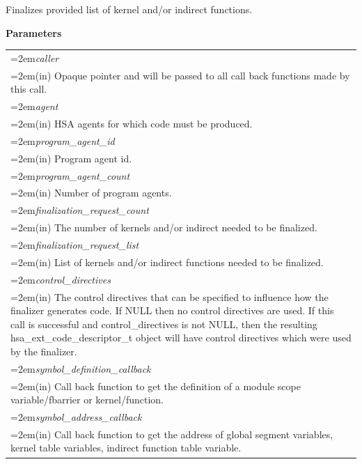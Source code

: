 \documentclass[final]{book}
\newcommand{\hsaarg}[1]{\textit{#1}}
\begin{document}
\vspace{-2mm}Finalizes provided list of kernel and/or indirect functions.

\noindent\textbf{Parameters}\\[-6mm]
\noindent\begin{longtable}{@{}>{\hangindent=2em}p{\textwidth}}
\hsaarg{caller}\\\hspace{2em}(in) Opaque pointer and will be passed to all call back functions made by this call.\\[2mm]
\hsaarg{agent}\\\hspace{2em}(in) HSA agents for which code must be produced.\\[2mm]
\hsaarg{program_\-agent_\-id}\\\hspace{2em}(in) Program agent id.\\[2mm]
\hsaarg{program_\-agent_\-count}\\\hspace{2em}(in) Number of program agents.\\[2mm]
\hsaarg{finalization_\-request_\-count}\\\hspace{2em}(in) The number of kernels and/or indirect needed to be finalized.\\[2mm]
\hsaarg{finalization_\-request_\-list}\\\hspace{2em}(in) List of kernels and/or indirect functions needed to be finalized.\\[2mm]
\hsaarg{control_\-directives}\\\hspace{2em}(in) The control directives that can be specified to influence how the finalizer generates code. If NULL then no control directives are used. If this call is successful and control_\-directives is not NULL, then the resulting hsa_\-ext_\-code_\-descriptor_\-t object will have control directives which were used by the finalizer.\\[2mm]
\hsaarg{symbol_\-definition_\-callback}\\\hspace{2em}(in) Call back function to get the definition of a module scope variable/fbarrier or kernel/function.\\[2mm]
\hsaarg{symbol_\-address_\-callback}\\\hspace{2em}(in) Call back function to get the address of global segment variables, kernel table variables, indirect function table variable.\\[2mm]

\end{longtable}
\end{document}
